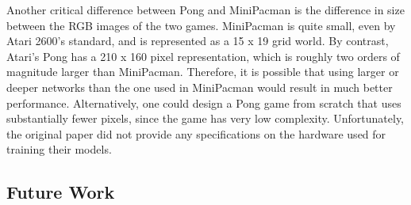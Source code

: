 \documentclass[10pt, twocolumn]{article}
\begin{document}
Another critical difference between Pong and MiniPacman is the difference in size between the RGB images of the two games. MiniPacman is quite small, even by Atari 2600's standard, and is represented as a 15 x 19 grid world. By contrast, Atari's Pong has a 210 x 160 pixel representation, which is roughly two orders of magnitude larger than MiniPacman. Therefore, it is possible that using larger or deeper networks than the one used in MiniPacman would result in much better performance. Alternatively, one could design a Pong game from scratch that uses substantially fewer pixels, since the game has very low complexity. Unfortunately, the original paper did not provide any specifications on the hardware used for training their models.

\subsection{Future Work}


{

}
\end{document}
